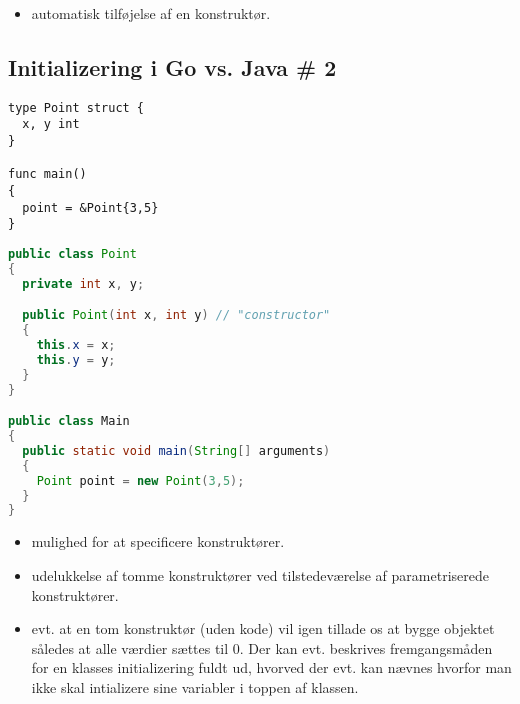 \begin{itemize}

\item automatisk tilføjelse af en konstruktør. 

\end{itemize}

\newpage

\subsection{Initializering i Go vs. Java \# 2}

\begin{lstlisting}
type Point struct {
  x, y int
}

func main()
{
  point = &Point{3,5}
}
\end{lstlisting}

\begin{lstlisting}[language=Java]
public class Point
{
  private int x, y;

  public Point(int x, int y) // "constructor"
  {
    this.x = x;
    this.y = y;
  }
}

public class Main
{
  public static void main(String[] arguments)
  {
    Point point = new Point(3,5);
  }
}
\end{lstlisting}

\begin{itemize}

\item mulighed for at specificere konstruktører.

\item udelukkelse af tomme konstruktører ved tilstedeværelse af parametriserede
konstruktører.

\item evt. at en tom konstruktør (uden kode) vil igen tillade os at bygge
objektet således at alle værdier sættes til 0. Der kan evt. beskrives
fremgangsmåden for en klasses initializering fuldt ud, hvorved der evt. kan
nævnes hvorfor man ikke skal intializere sine variabler i toppen af klassen.

\end{itemize}

